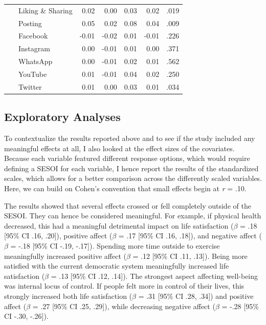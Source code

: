 \documentclass[
  man,floatsintext]{apa7}
\begin{document}
\begin{table}[tbp]
\begin{center}
\begin{threeparttable}
{\begin{tabular}{lrrrrr}
\ \ \ Liking \& Sharing & 0.02 & 0.00 & 0.03 & 0.02 & .019\\
\ \ \ Posting & 0.05 & 0.02 & 0.08 & 0.04 & .009\\
\ \ \ Facebook & -0.01 & -0.02 & 0.01 & -0.01 & .226\\
\ \ \ Instagram & 0.00 & -0.01 & 0.01 & 0.00 & .371\\
\ \ \ WhatsApp & 0.00 & -0.01 & 0.02 & 0.01 & .562\\
\ \ \ YouTube & 0.01 & -0.01 & 0.04 & 0.02 & .250\\
\ \ \ Twitter & 0.01 & 0.00 & 0.03 & 0.01 & .034\\
\bottomrule
\end{tabular}

}

\end{threeparttable}
\end{center}

\end{table}

\hypertarget{exploratory-analyses}{%
\subsection{Exploratory Analyses}\label{exploratory-analyses}}

To contextualize the results reported above and to see if the study included any meaningful effects at all, I also looked at the effect sizes of the covariates.
Because each variable featured different response options, which would require defining a SESOI for each variable, I hence report the results of the standardized scales, which allows for a better comparison across the differently scaled variables.
Here, we can build on Cohen's convention that small effects begin at \emph{r} = \textbar.10\textbar.

The results showed that several effects crossed or fell completely outside of the SESOI.
They can hence be considered meaningful.
For example, if physical health decreased, this had a meaningful detrimental impact on life satisfaction (\(\beta\) = .18 {[}95\% CI .16, .20{]}), positive affect (\(\beta\) = .17 {[}95\% CI .16, .18{]}), and negative affect (\(\beta\) = -.18 {[}95\% CI -.19, -.17{]}).
Spending more time outside to exercise meaningfully increased positive affect (\(\beta\) = .12 {[}95\% CI .11, .13{]}).
Being more satisfied with the current democratic system meaningfully increased life satisfaction (\(\beta\) = .13 {[}95\% CI .12, .14{]}).
The strongest aspect affecting well-being was internal locus of control.
If people felt more in control of their lives, this strongly increased both life satisfaction (\(\beta\) = .31 {[}95\% CI .28, .34{]}) and
positive affect (\(\beta\) = .27 {[}95\% CI .25, .29{]}),
while decreasing negative affect (\(\beta\) = -.28 {[}95\% CI -.30, -.26{]}).
\end{document}
